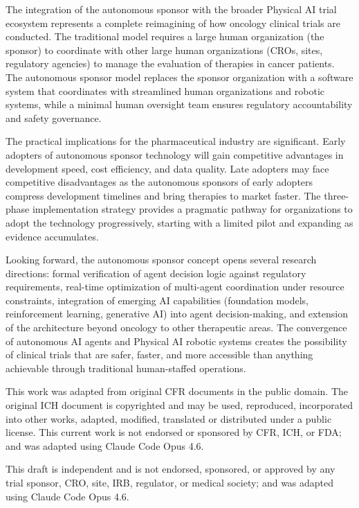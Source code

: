The integration of the autonomous sponsor with the broader Physical AI trial ecosystem
represents a complete reimagining of how oncology clinical trials are conducted. The
traditional model requires a large human organization (the sponsor) to coordinate with
other large human organizations (CROs, sites, regulatory agencies) to manage the
evaluation of therapies in cancer patients. The autonomous sponsor model replaces the
sponsor organization with a software system that coordinates with streamlined human
organizations and robotic systems, while a minimal human oversight team ensures regulatory
accountability and safety governance.

The practical implications for the pharmaceutical industry are significant. Early adopters
of autonomous sponsor technology will gain competitive advantages in development speed,
cost efficiency, and data quality. Late adopters may face competitive disadvantages as
the autonomous sponsors of early adopters compress development timelines and bring
therapies to market faster. The three-phase implementation strategy provides a pragmatic
pathway for organizations to adopt the technology progressively, starting with a limited
pilot and expanding as evidence accumulates.

Looking forward, the autonomous sponsor concept opens several research directions: formal
verification of agent decision logic against regulatory requirements, real-time optimization
of multi-agent coordination under resource constraints, integration of emerging AI
capabilities (foundation models, reinforcement learning, generative AI) into agent
decision-making, and extension of the architecture beyond oncology to other therapeutic
areas. The convergence of autonomous AI agents and Physical AI robotic systems creates the
possibility of clinical trials that are safer, faster, and more accessible than anything
achievable through traditional human-staffed operations.

This work was adapted from original CFR documents in the public domain. The original ICH
document is copyrighted and may be used, reproduced, incorporated into other works, adapted,
modified, translated or distributed under a public license. This current work is not endorsed
or sponsored by CFR, ICH, or FDA; and was adapted using Claude Code Opus 4.6.

This draft is independent and is not endorsed, sponsored, or approved by any trial sponsor,
CRO, site, IRB, regulator, or medical society; and was adapted using Claude Code Opus 4.6.

